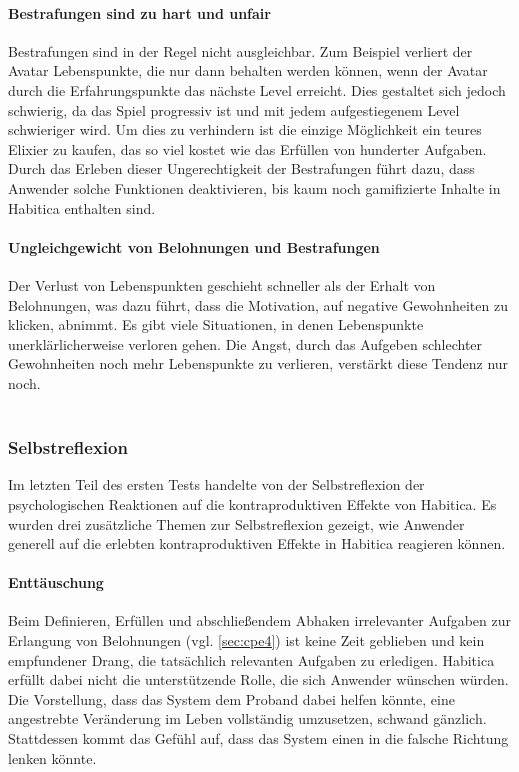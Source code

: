 \documentclass[sigconf, nonacm]{acmart}
\begin{document}
\paragraph{Bestrafungen sind zu hart und unfair}\label{sec:acpe3}
Bestrafungen sind in der Regel nicht ausgleichbar. Zum Beispiel verliert der Avatar Lebenspunkte, die nur dann behalten werden können, wenn der Avatar durch die Erfahrungspunkte das nächste Level erreicht. Dies gestaltet sich jedoch schwierig, da das Spiel progressiv ist und mit jedem aufgestiegenem Level schwieriger wird. Um dies zu verhindern ist die einzige Möglichkeit ein teures Elixier zu kaufen, das so viel kostet wie das Erfüllen von hunderter Aufgaben. Durch das Erleben dieser Ungerechtigkeit der Bestrafungen führt dazu, dass Anwender solche Funktionen deaktivieren, bis kaum noch gamifizierte Inhalte in Habitica enthalten sind.

\paragraph{Ungleichgewicht von Belohnungen und Bestrafungen}\label{sec:acpe4}
Der Verlust von Lebenspunkten geschieht schneller als der Erhalt von Belohnungen, was dazu führt, dass die Motivation, auf negative Gewohnheiten zu klicken, abnimmt. Es gibt viele Situationen, in denen Lebenspunkte unerklärlicherweise verloren gehen. Die Angst, durch das Aufgeben schlechter Gewohnheiten noch mehr Lebenspunkte zu verlieren, verstärkt diese Tendenz nur noch.
\\
\\
\subsubsection{Selbstreflexion}
Im letzten Teil des ersten Tests handelte von der Selbstreflexion der psychologischen Reaktionen auf die kontraproduktiven Effekte von Habitica. Es wurden drei zusätzliche Themen zur Selbstreflexion gezeigt, wie Anwender generell auf die erlebten kontraproduktiven Effekte in Habitica reagieren können.

\paragraph{Enttäuschung}\label{sec:sr1}
Beim Definieren, Erfüllen und abschließendem Abhaken irrelevanter Aufgaben zur Erlangung von Belohnungen (vgl. \ref{sec:cpe4}) ist keine Zeit geblieben und kein empfundener Drang, die tatsächlich relevanten Aufgaben zu erledigen. Habitica erfüllt dabei nicht die unterstützende Rolle, die sich Anwender wünschen würden. Die Vorstellung, dass das System dem Proband dabei helfen könnte, eine angestrebte Veränderung im Leben vollständig umzusetzen, schwand gänzlich. Stattdessen kommt das Gefühl auf, dass das System einen in die falsche Richtung lenken könnte.
\end{document}
